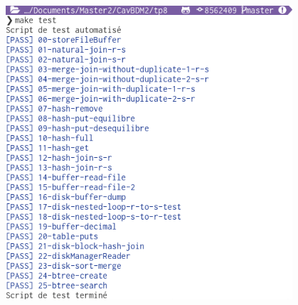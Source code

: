 \documentclass[a4paper]{article}
\begin{document}
\includegraphics[width=0.8\textwidth]{test.png}
\end{document}
